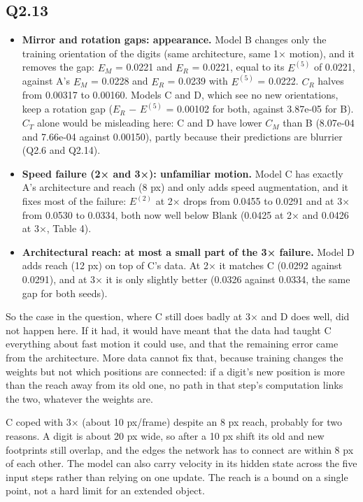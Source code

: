 \documentclass[11pt]{article}
\begin{document}
\subsection*{Q2.13}
\begin{itemize}
\item
  \textbf{Mirror and rotation gaps: appearance.} Model B changes only the training orientation of the digits (same architecture, same 1× motion), and it removes the gap: \(E_M\) = 0.0221 and \(E_R\) = 0.0221, equal to its \(E^{(5)}\) of 0.0221, against A's \(E_M\) = 0.0228 and \(E_R\) = 0.0239 with \(E^{(5)}\) = 0.0222. \(C_R\) halves from 0.00317 to 0.00160. Models C and D, which see no new orientations, keep a rotation gap (\(E_R\) − \(E^{(5)}\) = 0.00102 for both, against 3.87e-05 for B). \(C_T\) alone would be misleading here: C and D have lower \(C_M\) than B (8.07e-04 and 7.66e-04 against 0.00150), partly because their predictions are blurrier (Q2.6 and Q2.14).
\item
  \textbf{Speed failure (2× and 3×): unfamiliar motion.} Model C has exactly A's architecture and reach (8 px) and only adds speed augmentation, and it fixes most of the failure: \(E^{(2)}\) at 2× drops from 0.0455 to 0.0291 and at 3× from 0.0530 to 0.0334, both now well below Blank (0.0425 at 2× and 0.0426 at 3×, Table 4).
\item
  \textbf{Architectural reach: at most a small part of the 3× failure.} Model D adds reach (12 px) on top of C's data. At 2× it matches C (0.0292 against 0.0291), and at 3× it is only slightly better (0.0326 against 0.0334, the same gap for both seeds).
\end{itemize}

So the case in the question, where C still does badly at 3× and D does well, did not happen here. If it had, it would have meant that the data had taught C everything about fast motion it could use, and that the remaining error came from the architecture. More data cannot fix that, because training changes the weights but not which positions are connected: if a digit's new position is more than the reach away from its old one, no path in that step's computation links the two, whatever the weights are.

C coped with 3× (about 10 px/frame) despite an 8 px reach, probably for two reasons. A digit is about 20 px wide, so after a 10 px shift its old and new footprints still overlap, and the edges the network has to connect are within 8 px of each other. The model can also carry velocity in its hidden state across the five input steps rather than relying on one update. The reach is a bound on a single point, not a hard limit for an extended object.
\end{document}
